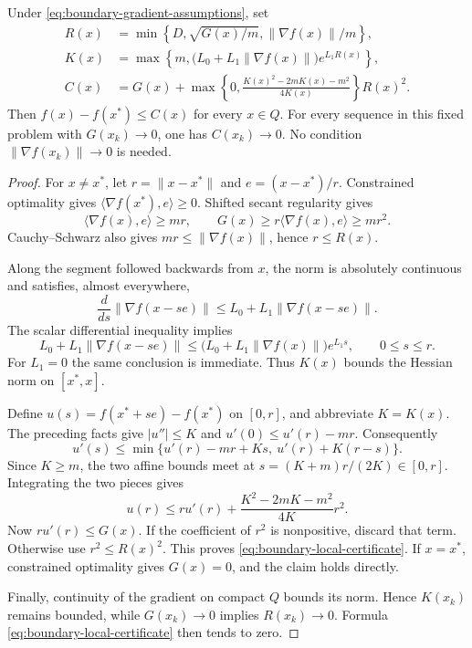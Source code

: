 \begin{theorem}
\label{thm:boundary-local-certificate}
Under \eqref{eq:boundary-gradient-assumptions}, set
\begin{align}
 R(x)&=\min\left\{D,\sqrt{G(x)/m},\|\nabla f(x)\|/m\right\},
       \label{eq:boundary-local-radius}\\
 K(x)&=\max\left\{m,
    \bigl(L_0+L_1\|\nabla f(x)\|\bigr)e^{L_1R(x)}\right\},
       \label{eq:boundary-local-curvature}\\
 C(x)&=G(x)+
   \max\left\{0,\frac{K(x)^2-2mK(x)-m^2}{4K(x)}\right\}R(x)^2.
       \label{eq:boundary-local-certificate}
\end{align}
Then $f(x)-f(x^*)\le C(x)$ for every $x\in Q$.
For every sequence in this fixed problem with $G(x_k)\to0$, one has
$C(x_k)\to0$. No condition $\|\nabla f(x_k)\|\to0$ is needed.
\end{theorem}
\begin{proof}
For $x\ne x^*$, let $r=\|x-x^*\|$ and $e=(x-x^*)/r$.
Constrained optimality gives
$\langle\nabla f(x^*),e\rangle\ge0$. Shifted secant regularity gives
\[
 \langle\nabla f(x),e\rangle\ge mr,\qquad
 G(x)\ge r\langle\nabla f(x),e\rangle\ge mr^2.
\]
Cauchy--Schwarz also gives $mr\le\|\nabla f(x)\|$, hence $r\le R(x)$.

Along the segment followed backwards from $x$, the norm is absolutely
continuous and satisfies, almost everywhere,
\[
 \frac{d}{ds}\|\nabla f(x-se)\|
 \le L_0+L_1\|\nabla f(x-se)\|.
\]
The scalar differential inequality implies
\[
 L_0+L_1\|\nabla f(x-se)\|
 \le\bigl(L_0+L_1\|\nabla f(x)\|\bigr)e^{L_1s},
       \qquad 0\le s\le r.
\]
For $L_1=0$ the same conclusion is immediate. Thus $K(x)$ bounds
the Hessian norm on $[x^*,x]$.

Define $u(s)=f(x^*+se)-f(x^*)$ on $[0,r]$, and abbreviate $K=K(x)$.
The preceding facts give $|u''|\le K$ and
$u'(0)\le u'(r)-mr$. Consequently
\[
 u'(s)\le
 \min\{u'(r)-mr+Ks,\ u'(r)+K(r-s)\}.
\]
Since $K\ge m$, the two affine bounds meet at
$s=(K+m)r/(2K)\in[0,r]$. Integrating the two pieces gives
\begin{equation}\label{eq:boundary-tent-integral}
 u(r)\le r u'(r)
       +\frac{K^2-2mK-m^2}{4K}r^2.
\end{equation}
Now $r u'(r)\le G(x)$. If the coefficient of $r^2$ is nonpositive,
discard that term. Otherwise use $r^2\le R(x)^2$.
This proves \eqref{eq:boundary-local-certificate}. If $x=x^*$,
constrained optimality gives $G(x)=0$, and the claim holds directly.

Finally, continuity of the gradient on compact $Q$ bounds its norm.
Hence $K(x_k)$ remains bounded, while $G(x_k)\to0$ implies
$R(x_k)\to0$. Formula \eqref{eq:boundary-local-certificate} then tends
to zero.
\end{proof}

